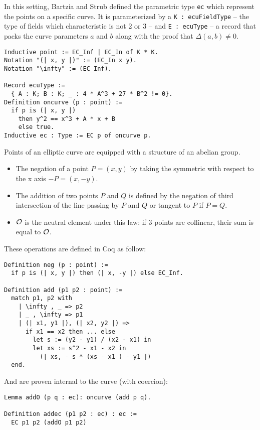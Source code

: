 In this setting, Bartzia and Strub defined the parametric type \texttt{ec} which
represent the points on a specific curve. It is parameterized by
a \texttt{K : ecuFieldType} -- the type of fields which characteristic is not 2 or 3 --
and \texttt{E : ecuType} -- a record that packs the curve parameters $a$ and $b$
along with the proof that $\Delta(a,b) \neq 0$.
\begin{lstlisting}[language=Coq]
Inductive point := EC_Inf | EC_In of K * K.
Notation "(| x, y |)" := (EC_In x y).
Notation "\infty" := (EC_Inf).

Record ecuType :=
  { A : K; B : K; _ : 4 * A^3 + 27 * B^2 != 0}.
Definition oncurve (p : point) :=
  if p is (| x, y |)
    then y^2 == x^3 + A * x + B
    else true.
Inductive ec : Type := EC p of oncurve p.
\end{lstlisting}

Points of an elliptic curve are equipped with a structure of an abelian group.
\begin{itemize}
  \item The negation of a point $P = (x,y)$ by taking the symmetric with respect to the x axis $-P = (x, -y)$.
  \item The addition of two points $P$ and $Q$ is defined by the negation of third intersection
  of the line passing by $P$ and $Q$ or tangent to $P$ if $P = Q$.
  \item $\mathcal{O}$ is the neutral element under this law: if 3 points are collinear, their sum is equal to $\mathcal{O}$.
\end{itemize}

These operations are defined in Coq as follow:
\begin{lstlisting}[language=Coq]
Definition neg (p : point) :=
  if p is (| x, y |) then (| x, -y |) else EC_Inf.

Definition add (p1 p2 : point) :=
  match p1, p2 with
    | \infty , _ => p2
    | _ , \infty => p1
    | (| x1, y1 |), (| x2, y2 |) =>
      if x1 == x2 then ... else
        let s := (y2 - y1) / (x2 - x1) in
        let xs := s^2 - x1 - x2 in
          (| xs, - s * (xs - x1 ) - y1 |)
  end.
\end{lstlisting}

And are proven internal to the curve (with coercion):
\begin{lstlisting}[language=Coq]
Lemma addO (p q : ec): oncurve (add p q).

Definition addec (p1 p2 : ec) : ec :=
  EC p1 p2 (addO p1 p2)
\end{lstlisting}

